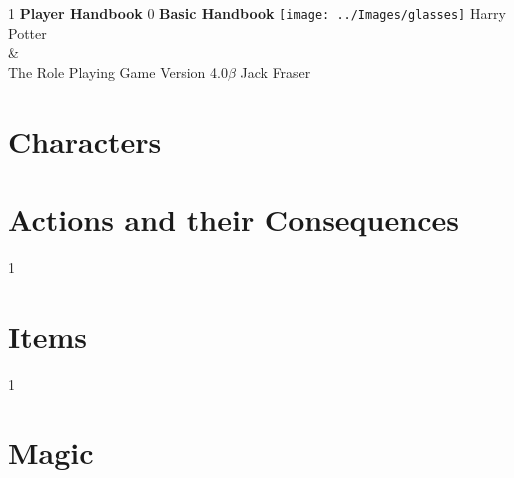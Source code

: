 \documentclass[oneside, twocolumn,9pt,english]{extbook}
\def\coreMode{1}
\newcommand*\cleartoleftpage{%
  \clearpage
  \ifodd\value{page}\hbox{}\clearpage\fi
}
\begin{document}
\begin{titlepage}
    \centering
    \vfill
    \if\coreMode1
    {\bfseries
        {\HP \fontsize{40}{35}\selectfont Player Handbook}
    }    
    \fi
    \if\coreMode0
    {\bfseries
        {\HP \fontsize{40}{35}\selectfont Basic Handbook}
    } 
    \fi
    \vfill
    \texttt{[image: ../Images/glasses]} %
    \vfill
    {\HP \fontsize{30}{24} \selectfont  Harry Potter \\\&\\ The Role Playing Game}
    \normalsize
    \vfill
    {\HP \fontsize{22}{0} \selectfont Version 4.0$\beta$ \hfill Jack Fraser}
\end{titlepage}

\setcounter{tocdepth}{1}  
\begin{spacing}{0.8}
\footnotesize
\tableofcontents
\normalsize
\end{spacing}


\cleartoleftpage
\part{Characters} \label{C:CharacterCreation}


%



\cleartoleftpage
\part{Actions and their Consequences}





\if\coreMode1	
	
\fi
\part{Items}


\if \coreMode1
	
\fi

\cleartoleftpage
\part{Magic}


\end{document}
